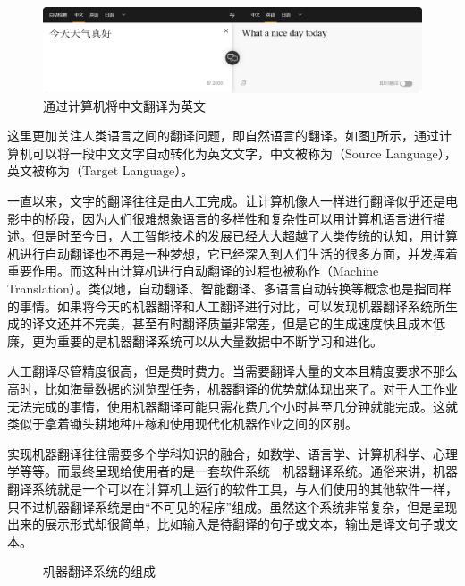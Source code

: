\begin{figure}[htp]
    \centering
\includegraphics[scale=0.2]{./Chapter1/Figures/figure-zh_en-example.png}
    \caption{通过计算机将中文翻译为英文}
    \label{fig:1-1}
\end{figure}

\parinterval 这里更加关注人类语言之间的翻译问题，即自然语言的翻译。如图\ref{fig:1-1}所示，通过计算机可以将一段中文文字自动转化为英文文字，中文被称为{\small{}}（Source Language），英文被称为{\small{}}（Target Language）。

\parinterval 一直以来，文字的翻译往往是由人工完成。让计算机像人一样进行翻译似乎还是电影中的桥段，因为人们很难想象语言的多样性和复杂性可以用计算机语言进行描述。但是时至今日，人工智能技术的发展已经大大超越了人类传统的认知，用计算机进行自动翻译也不再是一种梦想，它已经深入到人们生活的很多方面，并发挥着重要作用。而这种由计算机进行自动翻译的过程也被称作{\small{}}（Machine Translation）。类似地，自动翻译、智能翻译、多语言自动转换等概念也是指同样的事情。如果将今天的机器翻译和人工翻译进行对比，可以发现机器翻译系统所生成的译文还并不完美，甚至有时翻译质量非常差，但是它的生成速度快且成本低廉，更为重要的是机器翻译系统可以从大量数据中不断学习和进化。

\parinterval 人工翻译尽管精度很高，但是费时费力。当需要翻译大量的文本且精度要求不那么高时，比如海量数据的浏览型任务，机器翻译的优势就体现出来了。对于人工作业无法完成的事情，使用机器翻译可能只需花费几个小时甚至几分钟就能完成。这就类似于拿着锄头耕地种庄稼和使用现代化机器作业之间的区别。

\parinterval 实现机器翻译往往需要多个学科知识的融合，如数学、语言学、计算机科学、心理学等等。而最终呈现给使用者的是一套软件系统\ \dash\ 机器翻译系统。通俗来讲，机器翻译系统就是一个可以在计算机上运行的软件工具，与人们使用的其他软件一样，只不过机器翻译系统是由``不可见的程序''组成。虽然这个系统非常复杂，但是呈现出来的展示形式却很简单，比如输入是待翻译的句子或文本，输出是译文句子或文本。

\begin{figure}[htp]
    \centering

    \caption{机器翻译系统的组成}
    \label{fig:1-2}
\end{figure}

